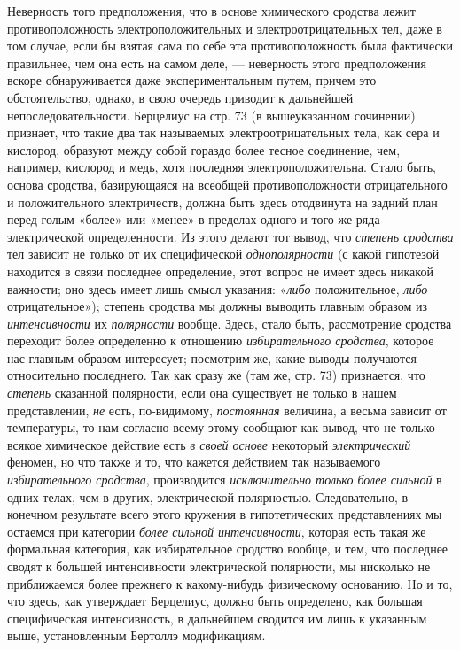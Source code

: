 Неверность того предположения, что в основе химического сродства лежит
противоположность электроположительных и электроотрицательных тел, даже в
том случае, если бы взятая сама по себе эта противоположность была
фактически правильнее, чем она есть на самом деле, — неверность этого
предположения вскоре обнаруживается даже экспериментальным путем, причем
это обстоятельство, однако, в свою очередь приводит к дальнейшей
непоследовательности. Берцелиус на стр. 73 (в вышеуказанном сочинении)
признает, что такие два так называемых электроотрицательных тела, как сера
и кислород, образуют между собой гораздо более тесное соединение, чем,
например, кислород и медь, хотя последняя электроположительна. Стало быть,
основа сродства, базирующаяся на всеобщей противоположности отрицательного
и положительного электричеств, должна быть здесь отодвинута на задний план
перед голым «более» или «менее» в пределах одного и того же ряда
электрической определенности. Из этого делают тот вывод, что
{\em степень сродства} тел зависит не только от их
специфической {\em однополярности} (с какой гипотезой
находится в связи последнее определение, этот вопрос не имеет здесь никакой
важности; оно здесь имеет лишь смысл указания:
«{\em либо} положительное,
{\em либо} отрицательное»); степень сродства мы должны
выводить главным образом из {\em интенсивности} их
{\em полярности} вообще. Здесь, стало быть,
рассмотрение сродства переходит более определенно к отношению
{\em избирательного сродства}, которое нас главным
образом интересует; посмотрим же, какие выводы получаются относительно
последнего. Так как сразу же (там же, стр. 73) признается, что
{\em степень} сказанной полярности, если она существует
не только в нашем представлении, {\em не} есть,
по-видимому, {\em постоянная} величина, а весьма зависит
от температуры, то нам согласно всему этому сообщают как вывод, что не
только всякое химическое действие есть {\em в своей
основе} некоторый {\em электрический} феномен, но что
также и то, что кажется действием так называемого
{\em избирательного сродства}, производится
{\em исключительно только более сильной} в одних телах,
чем в других, электрической полярностью. Следовательно, в конечном
результате всего этого кружения в гипотетических представлениях мы остаемся
при категории {\em более сильной интенсивности},
которая есть такая же формальная категория, как избирательное сродство
вообще, и тем, что последнее сводят к большей интенсивности электрической
полярности, мы нисколько не приближаемся более прежнего к какому-нибудь
физическому основанию. Но и то, что здесь, как утверждает Берцелиус, должно
быть определено, как большая специфическая интенсивность, в дальнейшем
сводится им лишь к указанным выше, установленным Бертоллэ модификациям.

